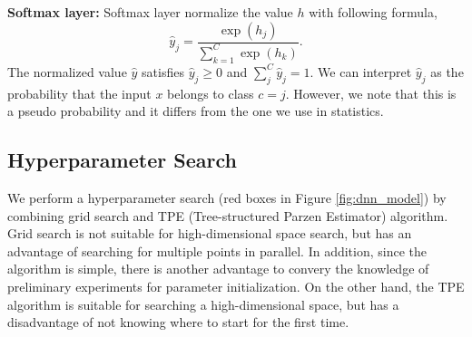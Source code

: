 \documentclass[useamsfonts]{pasj01}
\begin{document}
{\bf Softmax layer:}
Softmax layer normalize the value $h$ with following formula,
\begin{equation}
    \hat{y}_j = \frac{\exp \left( h_j \right)}{\sum_{k=1}^C \exp \left( h_k \right)}.
\end{equation}
The normalized value $\hat{y}$ satisfies $\hat{y}_j \geq 0$ and $\sum_j^C \hat{y}_j =1$.
We can interpret $\hat{y}_j$ as the probability that the input $x$ belongs to  class $c=j$.
However, we note that this is a pseudo probability and it differs from the one we use in statistics.
  
\subsection{Hyperparameter Search}\label{hyperparametersearch}
We perform a hyperparameter search (red boxes in Figure \ref{fig:dnn_model}) by combining grid search and TPE (Tree-structured Parzen Estimator) algorithm.
Grid search is not suitable for high-dimensional space search, but has an advantage of searching for multiple points in parallel.
In addition, since the algorithm is simple, there is another advantage to convery the knowledge of preliminary experiments for parameter initialization.
On the other hand, the TPE algorithm is suitable for searching a high-dimensional space, but has a disadvantage of not knowing where to start for the first time.
\end{document}
